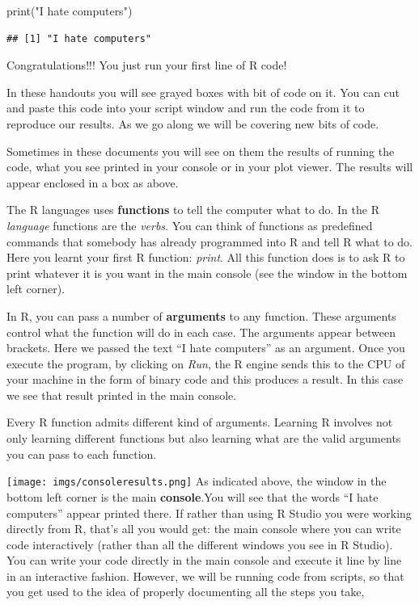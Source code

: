 \documentclass[
]{book}
\newenvironment{Shaded}{\begin{snugshade}}{\end{snugshade}}
\newcommand{\FunctionTok}[1]{\textcolor[rgb]{0.00,0.00,0.00}{#1}}
\newcommand{\NormalTok}[1]{#1}
\newcommand{\StringTok}[1]{\textcolor[rgb]{0.31,0.60,0.02}{#1}}
\begin{document}
\begin{Shaded}
\begin{Highlighting}[]
\FunctionTok{print}\NormalTok{(}\StringTok{"I hate computers"}\NormalTok{)}
\end{Highlighting}
\end{Shaded}

\begin{verbatim}
## [1] "I hate computers"
\end{verbatim}

Congratulations!!! You just run your first line of R code!

In these handouts you will see grayed boxes with bit of code on it. You can cut and paste this code into your script window and run the code from it to reproduce our results. As we go along we will be covering new bits of code.

Sometimes in these documents you will see on them the results of running the code, what you see printed in your console or in your plot viewer. The results will appear enclosed in a box as above.

The R languages uses \textbf{functions} to tell the computer what to do. In the R \emph{language} functions are the \emph{verbs}. You can think of functions as predefined commands that somebody has already programmed into R and tell R what to do. Here you learnt your first R function: \emph{print}. All this function does is to ask R to print whatever it is you want in the main console (see the window in the bottom left corner).

In R, you can pass a number of \textbf{arguments} to any function. These arguments control what the function will do in each case. The arguments appear between brackets. Here we passed the text ``I hate computers'' as an argument. Once you execute the program, by clicking on \emph{Run}, the R engine sends this to the CPU of your machine in the form of binary code and this produces a result. In this case we see that result printed in the main console.

Every R function admits different kind of arguments. Learning R involves not only learning different functions but also learning what are the valid arguments you can pass to each function.

\texttt{[image: imgs/consoleresults.png]}
As indicated above, the window in the bottom left corner is the main \textbf{console}.You will see that the words ``I hate computers'' appear printed there. If rather than using R Studio you were working directly from R, that's all you would get: the main console where you can write code interactively (rather than all the different windows you see in R Studio). You can write your code directly in the main console and execute it line by line in an interactive fashion. However, we will be running code from scripts, so that you get used to the idea of properly documenting all the steps you take,
\end{document}
